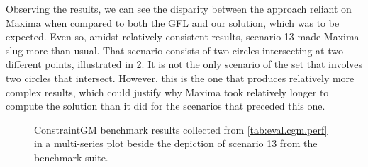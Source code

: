 Observing the results, we can see the disparity between the approach reliant on
Maxima when compared to both the \ac{GFL} and our solution, which was to be
expected.  Even so, amidst relatively consistent results, scenario 13 made
Maxima slug more than usual.  That scenario consists of two circles intersecting
at two different points, illustrated in \cref{fig:eval.cgm.perf.13}.  It is not
the only scenario of the set that involves two circles that intersect.  However,
this is the one that produces relatively more complex results, which could
justify why Maxima took relatively longer to compute the solution than it did
for the scenarios that preceded this one.

\begin{figure}[htb]
  \begin{subfigure}[t]{.75\linewidth}
    \centering
    \label{fig:eval.cgm.perf.plot}
  \end{subfigure}
  \hfill
  \begin{subfigure}[t]{.22\linewidth}
    \centering
    \label{fig:eval.cgm.perf.13}
  \end{subfigure}
  \caption[ConstraintGM benchmarks and Scenario 13]{\label{fig:eval.cgm.perf}%
    ConstraintGM benchmark results collected from \cref{tab:eval.cgm.perf} in a
    multi-series plot  beside the depiction of
    scenario 13  from the benchmark suite.}
\end{figure}


